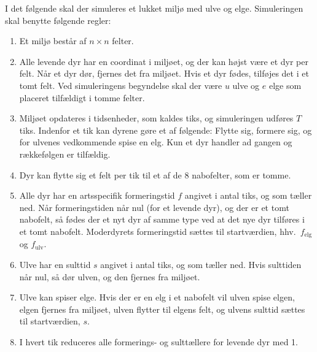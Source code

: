 I det følgende skal der simuleres et lukket miljø med ulve og elge. Simuleringen skal benytte følgende regler:
\begin{enumerate}
\item Et miljø består af $n\times n$ felter.
\item Alle levende dyr har en coordinat i miljøet, og der kan højst være et dyr per felt. Når et dyr dør, fjernes det fra miljøet. Hvis et dyr fødes, tilføjes det i et tomt felt. Ved simuleringens begyndelse skal der være $u$ ulve og $e$ elge som placeret tilfældigt i tomme felter.
\item Miljøet opdateres i tidsenheder, som kaldes tiks, og simuleringen udføres $T$ tiks. Indenfor et tik kan dyrene gøre et af følgende: Flytte sig, formere sig, og for ulvenes vedkommende spise en elg. Kun et dyr handler ad gangen og rækkefølgen er tilfældig.
\item Dyr kan flytte sig et felt per tik til et af de 8 nabofelter, som er tomme.
\item Alle dyr har en artsspecifik formeringstid $f$ angivet i antal tiks, og som tæller ned. Når formeringstiden når nul (for et levende dyr), og der er et tomt nabofelt, så fødes der et nyt dyr af samme type ved at det nye dyr tilføres i et tomt nabofelt. Moderdyrets formeringstid sættes til startværdien, hhv.\ $f_{\text{elg}}$ og $f_{\text{ulv}}$.
\item Ulve har en sulttid $s$ angivet i antal tiks, og som tæller ned. Hvis sulttiden når nul, så dør ulven, og den fjernes fra miljøet.
\item Ulve kan spiser elge. Hvis der er en elg i et nabofelt vil ulven spise elgen, elgen fjernes fra miljøet, ulven flytter til elgens felt, og ulvens sulttid sættes til startværdien, $s$.
\item I hvert tik reduceres alle formerings- og sulttællere for levende dyr med 1.
\end{enumerate}

